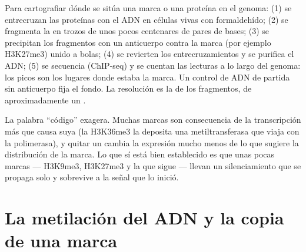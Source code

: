 \begin{method}\label{met:b3:chromatin-epigenetics:chip}
Para cartografiar dónde se sitúa una marca o una proteína en el genoma:
(1) se entrecruzan las proteínas con el ADN en células vivas con
formaldehído; (2) se fragmenta la  en trozos de unos pocos
centenares de pares de bases; (3) se precipitan los fragmentos con un
anticuerpo contra la marca (por ejemplo H3K27me3) unido a bolas; (4) se
revierten los entrecruzamientos y se purifica el ADN; (5) se secuencia
(ChIP-seq) y se cuentan las lecturas a lo largo del genoma: los picos son
los lugares donde estaba la marca. Un control de ADN de partida sin
anticuerpo fija el fondo. La resolución es la de los fragmentos, de
aproximadamente un .
\end{method}

\begin{remark}\label{rem:b3:chromatin-epigenetics:code}
La palabra ``código'' exagera. Muchas marcas son consecuencia de la
transcripción más que causa suya (la H3K36me3 la deposita una
metiltransferasa que viaja con la polimerasa), y quitar un 
cambia la expresión mucho menos de lo que sugiere la distribución de la
marca. Lo que sí está bien establecido es que unas pocas marcas ---
H3K9me3, H3K27me3 y la  que sigue --- llevan un
silenciamiento que se propaga solo y sobrevive a la señal que lo inició.
\end{remark}

\section{La metilación del ADN y la copia de una marca}

